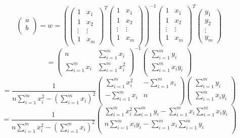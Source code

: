 \documentclass[11pt,a4paper,fleqn]{article}
\begin{document}
\[ 
\left( 
\begin{array}{c}
a\\
b\\
\end{array} 
\right)
=w=
\left( 
\left(
\begin{array}{cc}
1&x_1\\
1&x_2\\
\vdots&\vdots\\
1&x_m
\end{array} 
\right)
^T
\left(
\begin{array}{cc}
1&x_1\\
1&x_2\\
\vdots&\vdots\\
1&x_m\\
\end{array} 
\right)
\right)
^{-1}
\left(
\begin{array}{cc}
1&x_1\\
1&x_2\\
\vdots&\vdots\\
1&x_m\\
\end{array} 
\right)
^T
\left(
\begin{array}{c}
y_1\\
y_2\\
\vdots\\
y_m
\end{array} 
\right)
\]
\[
=
\left(
\begin{array}{cc}
n&\sum_{i=1}^{m}x_i\\
\sum_{i=1}^{m}x_i&\sum_{i=1}^{m}x_i^2\\
\end{array} 
\right)
^{-1}
\left(
\begin{array}{c}
\sum_{i=1}^{m}y_i\\
\sum_{i=1}^{m}x_iy_i\\
\end{array} 
\right)
\]
\[
=\frac{1}{n\sum_{i=1}^{m}x_i^2-(\sum_{i=1}^{m}x_i)^2}
\left(
\begin{array}{cc}
\sum_{i=1}^{m}x_i^2&-\sum_{i=1}^{m}x_i\\
-\sum_{i=1}^{m}x_i&n\\
\end{array} 
\right)
\left(
\begin{array}{c}
\sum_{i=1}^{m}y_i\\
\sum_{i=1}^{m}x_iy_i\\
\end{array} 
\right)
\]
\[
=\frac{1}{n\sum_{i=1}^{m}x_i^2-(\sum_{i=1}^{m}x_i)^2}
\left(
\begin{array}{c}
\sum_{i=1}^{m}x_i^2\sum_{i=1}^{m}y_i-\sum_{i=1}^{m}x_i\sum_{i=1}^{m}x_iy_i\\
n\sum_{i=1}^{m}x_iy_i-\sum_{i=1}^{m}x_i\sum_{i=1}^{m}y_i\\
\end{array} 
\right)
\]
\end{document}
